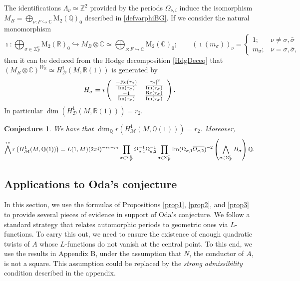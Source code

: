 \documentclass{amsart}
\newtheorem{conjecture}[theorem]{Conjecture}
\theoremstyle{definition}
\theoremstyle{remark}
\numberwithin{equation}{section}
\newcommand{\M}{\mathrm{M}}
\newcommand{\Z}{{\mathbb Z}}
\newcommand{\Q}{{\mathbb Q}}
\newcommand{\C}{{\mathbb C}}
\newcommand{\R}{{\mathbb R}}
\newcommand{\cD}{{\mathcal D}}
\newcommand{\cM}{{\mathcal M}}
\begin{document}
The identifications $\Lambda_\nu\simeq \Z^2$ provided by the periods $\Omega_{\nu,i}$ induce the isomorphism $M_B=\bigoplus_{\nu:F\hookrightarrow\C}\M_2(\Q)_0$  described in \eqref{defvarphiBG}. If we consider the natural monomorphism
\[
\imath:\bigoplus_{\sigma\in \Sigma_F^\C}\M_2(\R)_0\hookrightarrow M_B\otimes \C\simeq \bigoplus_{\nu:F\hookrightarrow\C}\M_2(\C)_0;\qquad (\imath(m_\sigma))_\nu=\left\{\begin{array}{ll}1;&\nu\neq \sigma,\bar\sigma\\m_\sigma;&\nu=\sigma,\bar\sigma,\end{array}\right. 
\]
then it can be deduced from the Hodge decomposition \eqref{HdgDeceq} that $(M_B\otimes \C)^{W_\R}\simeq H^1_{\cD}(M,\R(1))$ is generated by 
\begin{equation}\label{eqHsigma}
H_\sigma=\imath\left(\begin{array}{cc}\frac{-{\rm Re}(\tau_\sigma)}{{\rm Im}(\tau_\sigma)}&\frac{|\tau_\sigma|^2}{{\rm Im}(\tau_\sigma)}\\\frac{-1}{{\rm Im}(\tau_\sigma)}&\frac{{\rm Re}(\tau_\sigma)}{{\rm Im}(\tau_\sigma)}\end{array}\right).
\end{equation}
In particular $\dim(H^1_{\cD}(M,\R(1)))=r_2$.
\begin{conjecture}\label{R2calc} 
We have that $\dim_\Q r\left(H^1_{\cM}(M,\Q(1))\right)=r_2$. Moreover,
\begin{equation*}
  \bigwedge^{r_2}r\left(H^1_{\cM}(M,\Q(1))\right)=L(1,M)(2\pi i)^{-r_1-r_2}\prod_{\sigma\in\Sigma_F^\R}\Omega_{{\sigma},1}^{-1}\Omega_{{\sigma},2}^{-1}\prod_{\sigma\in\Sigma_F^\C}{\rm Im}(\Omega_{\sigma,1}\overline{\Omega_{\sigma,2}})^{-2}\left(\bigwedge_{\sigma\in\Sigma_F^\C} H_\sigma\right)\Q.
\end{equation*}
\end{conjecture}


\subsection{Applications to Oda's conjecture} In this section, we use the formulas of Propositions \ref{prop1}, \ref{prop2}, and \ref{prop3} to provide several pieces of evidence in support of Oda's conjecture. We follow a standard strategy that relates automorphic periods to geometric ones via $L$-functions. To carry this out, we need to ensure the existence of enough quadratic twists of $A$ whose $L$-functions do not vanish at the central point. To this end, we use the results in Appendix B, under the assumption that $N$, the conductor of $A$, is not a square. This assumption could be replaced by the \emph{strong admissibility} condition described in the appendix.
\end{document}
